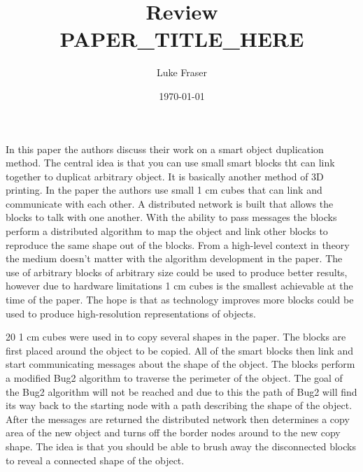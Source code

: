 \documentclass{article}
\begin{document}
\title{{\large Review} \\ PAPER_TITLE_HERE}
\author{Luke Fraser}
\date{\today}
\maketitle

\begingroup
\renewcommand{\section}[2]{}


\endgroup

\section*{Summary}
In this paper the authors discuss their work on a smart object duplication method. The central idea is that you can use small smart blocks tht can link together to duplicat arbitrary object. It is basically another method of 3D printing. In the paper the authors use small 1 cm cubes that can link and communicate with each other. A distributed network is built that allows the blocks to talk with one another. With the ability to pass messages the blocks perform a distributed algorithm to map the object and link other blocks to reproduce the same shape out of the blocks. From a high-level context in theory the medium doesn't matter with the algorithm development in the paper. The use of arbitrary blocks of arbitrary size could be used to produce better results, however due to hardware limitations 1 cm cubes is the smallest achievable at the time of the paper. The hope is that as technology improves more blocks could be used to produce high-resolution representations of objects.

20 1 cm cubes were used in to copy several shapes in the paper. The blocks are first placed around the object to be copied. All of the smart blocks then link and start communicating messages about the shape of the object. The blocks perform a modified Bug2 algorithm to traverse the perimeter of the object. The goal of the Bug2 algorithm will not be reached and due to this the path of Bug2 will find its way back to the starting node with a path describing the shape of the object. After the messages are returned the distributed network then determines a copy area of the new object and turns off the border nodes around to the new copy shape. The idea is that you should be able to brush away the disconnected blocks to reveal a connected shape of the object.
\end{document}
